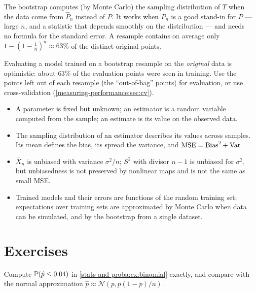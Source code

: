\begin{notechapter}
\begin{keyidea}
The bootstrap computes (by Monte Carlo) the sampling distribution of $T$ when
the data come from $\hat P_n$ instead of $P$. It works when $\hat P_n$ is a good
stand-in for $P$ --- large $n$, and a statistic that depends smoothly on the
distribution --- and needs no formula for the standard error. A resample
contains on average only $1 - (1-\frac1n)^n\approx63\%$ of the distinct
original points.
\end{keyidea}

\begin{pitfall}
Evaluating a model trained on a bootstrap resample on the \emph{original} data
is optimistic: about $63\%$ of the evaluation points were seen in training. Use
the points left out of each resample (the ``out-of-bag'' points) for
evaluation, or use cross-validation (\cref{measuring-performance:sec:cv}).
\end{pitfall}

\begin{chaptersummary}
\begin{itemize}[nosep]
  \item A parameter is fixed but unknown; an estimator is a random variable
        computed from the sample; an estimate is its value on the observed data.
  \item The sampling distribution of an estimator describes its values across
        samples. Its mean defines the bias, its spread the variance, and
        $\mathrm{MSE} = \mathrm{Bias}^2 + \operatorname{Var}$.
  \item $\bar X_n$ is unbiased with variance $\sigma^2/n$; $S^2$ with divisor
        $n-1$ is unbiased for $\sigma^2$, but unbiasedness is not preserved by
        nonlinear maps and is not the same as small MSE.
  \item Trained models and their errors are functions of the random training
        set; expectations over training sets are approximated by Monte Carlo
        when data can be simulated, and by the bootstrap from a single dataset.
\end{itemize}
\end{chaptersummary}

\section*{Exercises}

\begin{exercise}\label{stats-and-proba:exr:1}
Compute $\mathbb{P}(\hat p\leq0.04)$ in \cref{stats-and-proba:ex:binomial} exactly,
and compare with the normal approximation
$\hat p\approx\mathcal N(p, p(1-p)/n)$.
\end{exercise}


\end{notechapter}
